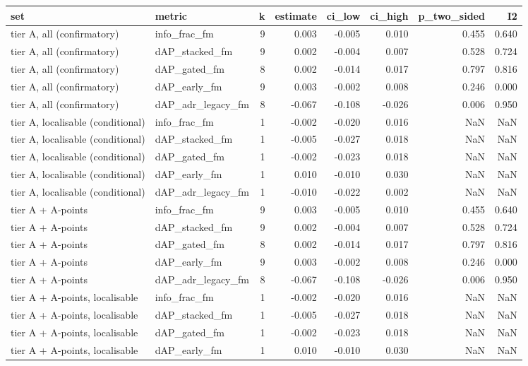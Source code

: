 \begin{tabular}{llrrrrrr}
\toprule
set & metric & k & estimate & ci_low & ci_high & p_two_sided & I2 \\
\midrule
tier A, all (confirmatory) & info\_frac\_fm & 9 & 0.003 & -0.005 & 0.010 & 0.455 & 0.640 \\
tier A, all (confirmatory) & dAP\_stacked\_fm & 9 & 0.002 & -0.004 & 0.007 & 0.528 & 0.724 \\
tier A, all (confirmatory) & dAP\_gated\_fm & 8 & 0.002 & -0.014 & 0.017 & 0.797 & 0.816 \\
tier A, all (confirmatory) & dAP\_early\_fm & 9 & 0.003 & -0.002 & 0.008 & 0.246 & 0.000 \\
tier A, all (confirmatory) & dAP\_adr\_legacy\_fm & 8 & -0.067 & -0.108 & -0.026 & 0.006 & 0.950 \\
tier A, localisable (conditional) & info\_frac\_fm & 1 & -0.002 & -0.020 & 0.016 & NaN & NaN \\
tier A, localisable (conditional) & dAP\_stacked\_fm & 1 & -0.005 & -0.027 & 0.018 & NaN & NaN \\
tier A, localisable (conditional) & dAP\_gated\_fm & 1 & -0.002 & -0.023 & 0.018 & NaN & NaN \\
tier A, localisable (conditional) & dAP\_early\_fm & 1 & 0.010 & -0.010 & 0.030 & NaN & NaN \\
tier A, localisable (conditional) & dAP\_adr\_legacy\_fm & 1 & -0.010 & -0.022 & 0.002 & NaN & NaN \\
tier A + A-points & info\_frac\_fm & 9 & 0.003 & -0.005 & 0.010 & 0.455 & 0.640 \\
tier A + A-points & dAP\_stacked\_fm & 9 & 0.002 & -0.004 & 0.007 & 0.528 & 0.724 \\
tier A + A-points & dAP\_gated\_fm & 8 & 0.002 & -0.014 & 0.017 & 0.797 & 0.816 \\
tier A + A-points & dAP\_early\_fm & 9 & 0.003 & -0.002 & 0.008 & 0.246 & 0.000 \\
tier A + A-points & dAP\_adr\_legacy\_fm & 8 & -0.067 & -0.108 & -0.026 & 0.006 & 0.950 \\
tier A + A-points, localisable & info\_frac\_fm & 1 & -0.002 & -0.020 & 0.016 & NaN & NaN \\
tier A + A-points, localisable & dAP\_stacked\_fm & 1 & -0.005 & -0.027 & 0.018 & NaN & NaN \\
tier A + A-points, localisable & dAP\_gated\_fm & 1 & -0.002 & -0.023 & 0.018 & NaN & NaN \\
tier A + A-points, localisable & dAP\_early\_fm & 1 & 0.010 & -0.010 & 0.030 & NaN & NaN \\

\end{tabular}
